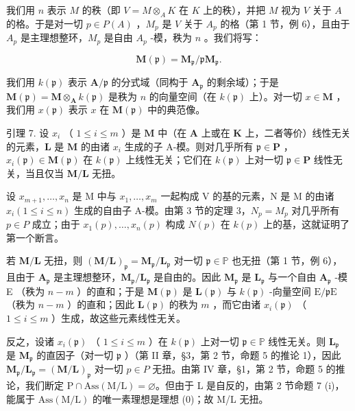我们用 \(n\) 表示 \(M\) 的秩（即 \(V = M \otimes_{A} K\) 在 \(K\) 上的秩），并把 \(M\) 视为 \(V\) 关于 \(A\) 的格。于是对一切 \(p \in P(A)\) ，\(M_p\) 是 \(V\) 关于 \(A_p\) 的格（第 1 节，例 6），且由于 \(A_p\) 是主理想整环，\(M_p\) 是自由 \(A_p\) -模，秩为 \(n\) 。我们将写：

\[
\mathbf {M} (\mathfrak {p}) = \mathbf {M} _ {\mathfrak {p}} / \mathfrak {p} \mathbf {M} _ {\mathfrak {p}}.
\]

我们用 \(k(\mathfrak{p})\) 表示 \(\mathbf{A} / \mathfrak{p}\) 的分式域（同构于 \(\mathbf{A}_{\mathfrak{p}}\) 的剩余域）；于是 \(\mathbf{M}(\mathfrak{p}) = \mathbf{M} \otimes_{\mathbf{A}} k(\mathfrak{p})\) 是秩为 \(n\) 的向量空间（在 \(k(\mathfrak{p})\) 上）。对一切 \(x \in \mathbf{M}\) ，我们用 \(x(\mathfrak{p})\) 表示 \(x\) 在 \(\mathbf{M}(\mathfrak{p})\) 中的典范像。

引理 7. 设 \(x_{i}\) （ \(1 \leqslant i \leqslant m\) ）是 \(\mathbf{M}\) 中（在 \(\mathbf{A}\) 上或在 \(\mathbf{K}\) 上，二者等价）线性无关的元素，\(\mathbf{L}\) 是 \(\mathbf{M}\) 的由诸 \(x_{i}\) 生成的子 A-模。则对几乎所有 \(\mathfrak{p} \in \mathbf{P}\) ，\(x_{i}(\mathfrak{p}) \in \mathbf{M}(\mathfrak{p})\) 在 \(k(\mathfrak{p})\) 上线性无关；它们在 \(k(\mathfrak{p})\) 上对一切 \(\mathfrak{p} \in \mathbf{P}\) 线性无关，当且仅当 \(\mathbf{M}/\mathbf{L}\) 无扭。

设 \(x_{m+1}, \ldots, x_n\) 是 M 中与 \(x_1, \ldots, x_m\) 一起构成 V 的基的元素，N 是 M 的由诸 \(x_i (1 \leqslant i \leqslant n)\) 生成的自由子 A-模。由第 3 节的定理 3，\(N_p = M_p\) 对几乎所有 \(p \in P\) 成立；由于 \(x_1(p), \ldots, x_n(p)\) 构成 \(N(p)\) 在 \(k(p)\) 上的基，这就证明了第一个断言。

若 \(\mathbf{M} / \mathbf{L}\) 无扭，则 \((\mathbf{M} / \mathbf{L})_{\mathfrak{p}} = \mathbf{M}_{\mathfrak{p}} / \mathbf{L}_{\mathfrak{p}}\) 对一切 \(\mathfrak{p} \in \mathbb{P}\) 也无扭（第 1 节，例 6），且由于 \(\mathbf{A}_{\mathfrak{p}}\) 是主理想整环，\(\mathbf{M}_{\mathfrak{p}} / \mathbf{L}_{\mathfrak{p}}\) 是自由的。因此 \(\mathbf{M}_{\mathfrak{p}}\) 是 \(\mathbf{L}_{\mathfrak{p}}\) 与一个自由 \(\mathbf{A}_{\mathfrak{p}}\) -模 E （秩为 \(n - m\) ）的直和；于是 \(\mathbf{M}(\mathfrak{p})\) 是 \(\mathbf{L}(\mathfrak{p})\) 与 \(k(\mathfrak{p})\) -向量空间 \(\mathrm{E} / \mathfrak{p}\mathrm{E}\) （秩为 \(n - m\) ）的直和；因此 \(\mathbf{L}(\mathfrak{p})\) 的秩为 \(m\) ，而它由诸 \(x_{i}(\mathfrak{p})\) （ \(1 \leqslant i \leqslant m\) ）生成，故这些元素线性无关。

反之，设诸 \(x_{i}(\mathfrak{p})\) （ \(1 \leqslant i \leqslant m\) ）在 \(k(\mathfrak{p})\) 上对一切 \(\mathfrak{p} \in \mathbb{P}\) 线性无关。则 \(\mathbf{L}_{\mathfrak{p}}\) 是 \(\mathbf{M}_{\mathfrak{p}}\) 的直因子（对一切 \(\mathfrak{p}\) ）（第 II 章，§3，第 2 节，命题 5 的推论 1），因此 \(\mathbf{M}_{\mathfrak{p}} / \mathbf{L}_{\mathfrak{p}} = (\mathbf{M} / \mathbf{L})_{\mathfrak{p}}\) 对一切 \(p \in P\) 无扭。由第 IV 章，§1，第 2 节，命题 5 的推论，我们断定 \(\mathrm{P} \cap \mathrm{Ass}(\mathrm{M}/\mathrm{L}) = \varnothing\)。但由于 L 是自反的，由第 2 节命题 7 (i)，能属于 \(\mathrm{Ass}(\mathrm{M}/\mathrm{L})\) 的唯一素理想是理想 (0)；故 M/L 无扭。

